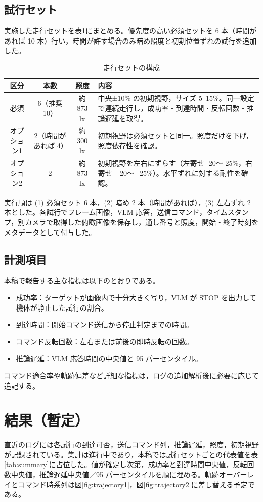 \documentclass[a4paper,11pt]{ltjsreport}
\begin{document}
\section{試行セット}
実施した走行セットを表\ref{tab:runs}にまとめる。優先度の高い必須セットを 6 本（時間があれば 10 本）行い，時間が許す場合のみ暗め照度と初期位置ずれの試行を追加した。

\begin{table}[htbp]
  \centering
  \caption{走行セットの構成}
  \label{tab:runs}
  \begin{tabular}{|c|c|c|p{7cm}|}
    \hline
    区分 & 本数 & 照度 & 内容 \\
    \hline
    必須 & 6（推奨 10） & 約 873 lx & 中央±10\% の初期視野，サイズ 5--15\%。同一設定で連続走行し，成功率・到達時間・反転回数・推論遅延を取得。 \\
    オプション1 & 2（時間があれば 4） & 約 300 lx & 初期視野は必須セットと同一。照度だけを下げ，照度依存性を確認。 \\
    オプション2 & 2 & 約 873 lx & 初期視野を左右にずらす（左寄せ -20〜-25\%，右寄せ +20〜+25\%）。水平ずれに対する耐性を確認。 \\
    \hline
  \end{tabular}
\end{table}

実行順は (1) 必須セット 6 本，(2) 暗め 2 本（時間があれば），(3) 左右ずれ 2 本とした。各試行でフレーム画像，VLM 応答，送信コマンド，タイムスタンプ，別カメラで取得した俯瞰画像を保存し，通し番号と照度，開始・終了時刻をメタデータとして付与した。

\section{計測項目}
本稿で報告する主な指標は以下のとおりである。
\begin{itemize}
  \item 成功率：ターゲットが画像内で十分大きく写り，VLM が STOP を出力して機体が静止した試行の割合。
  \item 到達時間：開始コマンド送信から停止判定までの時間。
  \item コマンド反転回数：左右または前後の即時反転の回数。
  \item 推論遅延：VLM 応答時間の中央値と 95 パーセンタイル。
\end{itemize}
コマンド適合率や軌跡偏差など詳細な指標は，ログの追加解析後に必要に応じて追記する。

\chapter{結果（暫定）}
\label{chap:results}
直近のログには各試行の到達可否，送信コマンド列，推論遅延，照度，初期視野が記録されている。集計は進行中であり，本稿では試行セットごとの代表値を表\ref{tab:summary}に占位した。値が確定し次第，成功率と到達時間中央値，反転回数中央値，推論遅延中央値／95 パーセンタイルを順に埋める。軌跡オーバーレイとコマンド時系列は図\ref{fig:trajectory1}，図\ref{fig:trajectory2}に差し替える予定である。
\end{document}
